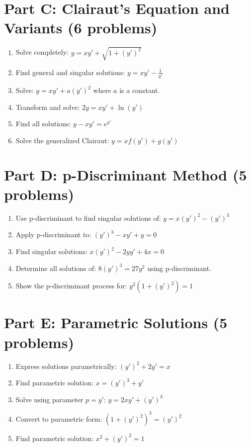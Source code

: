 \documentclass[12pt]{article}
\begin{document}
\section*{Part C: Clairaut's Equation and Variants (6 problems)}

\begin{enumerate}[resume]
\item Solve completely: $y = xy' + \sqrt{1 + (y')^2}$

\item Find general and singular solutions: $y = xy' - \frac{1}{y'}$

\item Solve: $y = xy' + a(y')^2$ where $a$ is a constant.

\item Transform and solve: $2y = xy' + \ln(y')$

\item Find all solutions: $y - xy' = e^{y'}$

\item Solve the generalized Clairaut: $y = x f(y') + g(y')$
\end{enumerate}

\section*{Part D: p-Discriminant Method (5 problems)}

\begin{enumerate}[resume]
\item Use p-discriminant to find singular solutions of: $y = x(y')^2 - (y')^3$

\item Apply p-discriminant to: $(y')^3 - xy' + y = 0$

\item Find singular solutions: $x(y')^2 - 2yy' + 4x = 0$

\item Determine all solutions of: $8(y')^3 = 27y^2$ using p-discriminant.

\item Show the p-discriminant process for: $y^2(1 + (y')^2) = 1$
\end{enumerate}

\section*{Part E: Parametric Solutions (5 problems)}

\begin{enumerate}[resume]
\item Express solutions parametrically: $(y')^2 + 2y' = x$

\item Find parametric solution: $x = (y')^3 + y'$

\item Solve using parameter $p = y'$: $y = 2xy' + (y')^3$

\item Convert to parametric form: $(1 + (y')^2)^3 = (y')^2$

\item Find parametric solution: $x^2 + (y')^2 = 1$
\end{enumerate}
\end{document}
